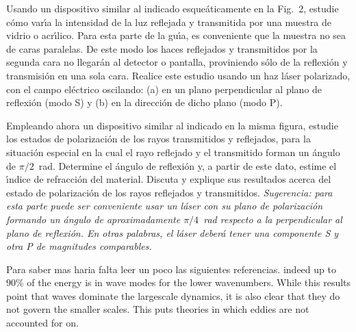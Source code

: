 \documentclass[epj]{svjour}
\begin{document}
Usando un dispositivo similar al indicado esque\'aticamente en la Fig.~2, 
estudie c\'omo var\'\i a la intensidad de la luz reflejada y transmitida por 
una muestra de vidrio o acr\'\i lico. Para esta parte de la gu\'\i a, es 
conveniente que la muestra no sea de caras paralelas. De este modo los haces
reflejados y transmitidos por la segunda cara no llegar\'an al detector o
pantalla, proviniendo s\'olo de la reflexi\'on y transmisi\'on en una sola 
cara. Realice este estudio usando un haz l\'aser polarizado, con el campo
el\'ectrico oscilando: (a) en un plano perpendicular al plano de reflexi\'on 
(modo S) y (b) en la direcci\'on de dicho plano (modo P).

Empleando ahora un dispositivo similar al indicado en la misma figura, estudie
los estados de polarizaci\'on de los rayos transmitidos y reflejados, para la
situaci\'on especial en la cual el rayo reflejado y el transmitido forman 
un \'angulo de $\pi/2$~rad. Determine el \'angulo de reflexi\'on y, a 
partir de este dato, estime el \'\i ndice de refracci\'on del material. 
Discuta y explique sus resultados acerca del estado de polarizaci\'on de los
rayos reflejados y transmitidos. {\it Sugerencia: para esta parte puede 
ser conveniente usar un l\'aser con su plano de polarizaci\'on formando un
\'angulo de aproximadamente $\pi/4$~rad respecto a la perpendicular al plano
de reflexi\'on. En otras palabras, el l\'aser deber\'a tener una componente
S y otra P de magnitudes comparables. }

\begin{sabermas}
Para saber mas haria falta leer un poco las siguientes referencias.
indeed up to 90\% of the energy is in wave modes for the lower
wavenumbers. While this results point that waves dominate the largescale
dynamics, it is also clear that they do not govern the smaller scales.
This puts theories in which eddies are not accounted for on.
\end{sabermas}

% 
% 
\end{document}

